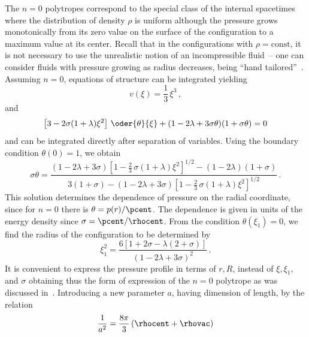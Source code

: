 The $n=0$ polytropes correspond to the special class of the internal \SaodS{}
spacetimes~\cite{Stu:2000:ACTPS2:} where the distribution of density $\rho$ is
uniform although the pressure grows monotonically from its zero value on the
surface of the configuration to a maximum value at its center. Recall that in
the configurations with $\rho = \mathrm {const}$, it is not necessary to use
the unrealistic notion of an incompressible fluid~-- one can consider fluids
with pressure growing as radius decreases, being ``hand
tailored''~\cite{Mis-Tho-Whe:1973:Gra:}.  Assuming $n=0$, equations of
structure can be integrated yielding
\begin{equation}
    v(\xi) = \frac{1}{3}\,\xi^{3}\,,                       \label{Eq:grp87}
\end{equation}
and
\begin{equation}
  \left[3-2\sigma(1+\lambda)\xi^{2}\right]\,\oder{\theta}{\xi}
  + (1-2\lambda+3\sigma\theta)(1+\sigma\theta) = 0         \label{Eq:grp88}
\end{equation}
and can be integrated directly after separation of variables. Using the
boundary condition $\theta(0)=1$, we obtain
\begin{equation}
  \sigma\theta = \frac%
    {(1-2\lambda+3\sigma)%
      \left[1-\frac{2}{3}\,\sigma(1+\lambda)\xi^{2}\right]^{1/2}
      -(1-2\lambda)(1+\sigma)}%
    {3(1+\sigma)-(1-2\lambda+3\sigma)
      \left[1-\frac{2}{3}\,
      \sigma(1+\lambda)\xi^{2}\right]^{1/2}}\,.            \label{Eq:grp89}
\end{equation}
This solution determines the dependence of pressure on the radial coordinate,
since for $n=0$ there is $\theta = p(r)/\pcent$. The dependence is
given in units of the energy density since $\sigma =
\pcent/\rhocent$. From the condition $\theta(\xi_{1})= 0$, we find the
radius of the configuration to be determined by
\begin{equation}
  \xi_{1}^{2} = \frac{6[1+2\sigma-\lambda(2+\sigma)]}%
                 {(1-2\lambda+3\sigma)^{2}}\,.             \label{Eq:grp90}
\end{equation}
It is convenient to express the pressure profile in terms of $r, R$, instead
of $\xi, \xi_{1}$, and $\sigma$ obtaining thus the form of expression of the
$n=0$ polytrope as was discussed in~\cite{Stu:2000:ACTPS2:}. Introducing a new
parameter $a$, having dimension of length, by the relation
\begin{equation}
  \frac{1}{a^{2}}
    = \frac{8\pi}{3}\,(\rhocent + \rhovac)     \label{Eq:grp91}
\end{equation}
